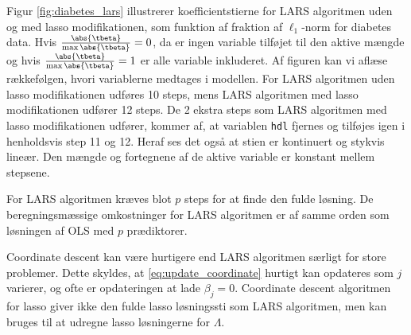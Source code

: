 \begin{eks}
Figur \ref{fig:diabetes_lars} illustrerer koefficientstierne for LARS algoritmen uden og med lasso modifikationen, som funktion af fraktion af \(\ell_1\)-norm for diabetes data.
Hvis \(\frac{\abs{\tbeta}}{\max \abs{\tbeta}} = 0\), da er ingen variable tilføjet til den aktive mængde og hvis \(\frac{\abs{\tbeta}}{\max \abs{\tbeta}} = 1\) er alle variable inkluderet.
Af figuren kan vi aflæse rækkefølgen, hvori variablerne medtages i modellen.
For LARS algoritmen uden lasso modifikationen udføres 10 steps, mens LARS algoritmen med lasso modifikationen udfører 12 steps.
De 2 ekstra steps som LARS algoritmen med lasso modifikationen udfører, kommer af, at variablen \texttt{hdl} fjernes og tilføjes igen i henholdsvis step 11 og 12.
Heraf ses det også at stien er kontinuert og stykvis lineær.
Den mængde og fortegnene af de aktive variable er konstant mellem stepsene.

\end{eks}


For LARS algoritmen kræves blot \(p\) steps for at finde den fulde løsning.
De beregningsmæssige omkostninger for LARS algoritmen er af samme orden som løsningen af OLS med \(p\) prædiktorer.

Coordinate descent kan være hurtigere end LARS algoritmen særligt for store problemer.
Dette skyldes, at \eqref{eq:update_coordinate} hurtigt kan opdateres som \(j\) varierer, og ofte er opdateringen at lade \(\beta_j = 0\).
Coordinate descent algoritmen for lasso giver ikke den fulde lasso løsningssti som LARS algoritmen, men kan bruges til at udregne lasso løsningerne for \(\Lambda\).




